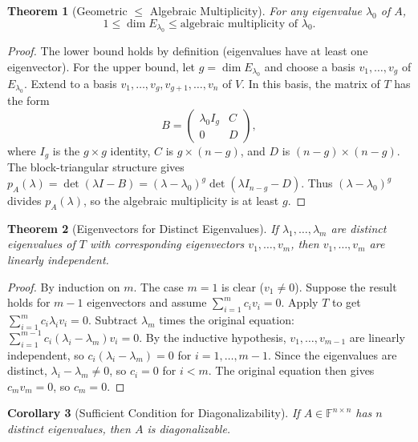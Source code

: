 \documentclass[11pt,a4paper]{article}
\theoremstyle{definition}
\theoremstyle{plain}
\newtheorem{theorem}{Theorem}[section]
\newtheorem{corollary}[theorem]{Corollary}
\theoremstyle{remark}
\newcommand{\F}{\mathbb{F}}
\begin{document}
\begin{theorem}[Geometric $\leq$ Algebraic Multiplicity]
\label{thm:geom_leq_alg}
For any eigenvalue $\lambda_0$ of $A$,
\[
    1 \leq \dim E_{\lambda_0} \leq \text{algebraic multiplicity of } \lambda_0.
\]
\end{theorem}

\begin{proof}
The lower bound holds by definition (eigenvalues have at least one eigenvector). For the
upper bound, let $g = \dim E_{\lambda_0}$ and choose a basis $v_1, \ldots, v_g$ of
$E_{\lambda_0}$. Extend to a basis $v_1, \ldots, v_g, v_{g+1}, \ldots, v_n$ of $V$.
In this basis, the matrix of $T$ has the form
\[
    B = \begin{pmatrix} \lambda_0 I_g & C \\ 0 & D \end{pmatrix},
\]
where $I_g$ is the $g \times g$ identity, $C$ is $g \times (n - g)$, and $D$ is
$(n - g) \times (n - g)$. The block-triangular structure gives
$p_A(\lambda) = \det(\lambda I - B) = (\lambda - \lambda_0)^g \det(\lambda I_{n-g} - D)$.
Thus $(\lambda - \lambda_0)^g$ divides $p_A(\lambda)$, so the algebraic multiplicity
is at least $g$.
\end{proof}

\begin{theorem}[Eigenvectors for Distinct Eigenvalues]
\label{thm:distinct_eigenvalues}
If $\lambda_1, \ldots, \lambda_m$ are distinct eigenvalues of $T$ with corresponding
eigenvectors $v_1, \ldots, v_m$, then $v_1, \ldots, v_m$ are linearly independent.
\end{theorem}

\begin{proof}
By induction on $m$. The case $m = 1$ is clear ($v_1 \neq 0$). Suppose the result holds for
$m - 1$ eigenvectors and assume $\sum_{i=1}^m c_i v_i = 0$. Apply $T$ to get
$\sum_{i=1}^m c_i \lambda_i v_i = 0$. Subtract $\lambda_m$ times the original equation:
$\sum_{i=1}^{m-1} c_i (\lambda_i - \lambda_m) v_i = 0$. By the inductive hypothesis,
$v_1, \ldots, v_{m-1}$ are linearly independent, so $c_i(\lambda_i - \lambda_m) = 0$ for
$i = 1, \ldots, m-1$. Since the eigenvalues are distinct, $\lambda_i - \lambda_m \neq 0$,
so $c_i = 0$ for $i < m$. The original equation then gives $c_m v_m = 0$, so $c_m = 0$.
\end{proof}

\begin{corollary}[Sufficient Condition for Diagonalizability]
\label{cor:diag_distinct}
If $A \in \F^{n \times n}$ has $n$ distinct eigenvalues, then $A$ is diagonalizable.
\end{corollary}
\end{document}
